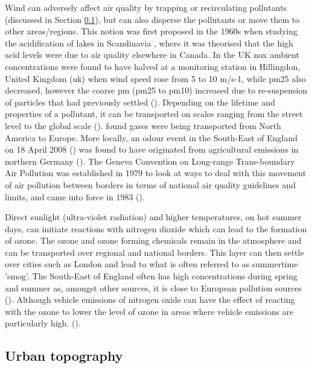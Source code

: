 Wind can adversely affect air quality by trapping or recirculating pollutants (discussed in Section \ref{subsec:urbantopography}), but can also disperse the pollutants or move them to other areas/regions. This notion was first proposed in the 1960s when studying the acidification of lakes in Scandinavia \cite{Summers1976}, where it was theorised that the high acid levels were due to air quality elsewhere in Canada. In the UK \gls{nox} ambient concentrations were found to have halved at a monitoring station in Hillingdon, United Kingdom (\gls{uk}) when wind speed rose from 5 to 10 m/s-1, while \gls{pm25} also decreased, however the coarse \gls{pm} (\gls{pm25} to \gls{pm10}) increased due to re-suspension of particles that had previously settled (\cite{DEFRA2007}). Depending on the lifetime and properties of a pollutant, it can be transported on scales ranging from the street level to the global scale (\cite{Monks2009}). \cite{Stohl2003} found gases were being transported from North America to Europe. More locally, an odour event in the South-East of England on 18 April 2008 (\cite{TheGuardian2008}) was found to have originated from agricultural emissions in northern Germany (\cite{Smethurst2012}). The Geneva Convention on Long-range Trans-boundary Air Pollution was established in 1979 to look at ways to deal with this movement of air pollution between borders in terms of national air quality guidelines and limits, and came into force in 1983 (\cite{UnitedNationsEconomicCommissionforEurope1983}).

Direct sunlight (ultra-violet radiation) and higher temperatures, on hot summer days, can initiate reactions with nitrogen dioxide which can lead to the formation of ozone. The ozone and ozone forming chemicals remain in the atmosphere and can be transported over regional and national borders. This layer can then settle over cities such as London and lead to what is often referred to as summertime 'smog'. The South-East of England often has high concentrations during spring and summer as, amongst other sources, it is close to European pollution sources (\cite{LondonAir}). Although vehicle emissions of nitrogen oxide can have the effect of reacting with the ozone to lower the level of ozone in areas where vehicle emissions are particularly high. (\cite{EnvironmentalProtectionAgency2012}).


\subsection{Urban topography}
\label{subsec:urbantopography}

